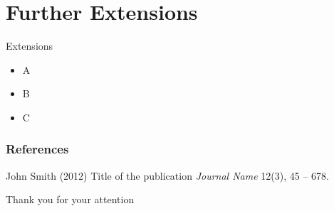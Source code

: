 \documentclass{beamer}
\begin{document}
\section{Further Extensions}
\begin{frame}{Extensions}
    \begin{itemize}
        \item A
        \item B
        \item C
    \end{itemize}
\end{frame}
\begin{frame}
\frametitle{References}
\footnotesize{
\begin{thebibliography}{99} %
 John Smith (2012)
\newblock Title of the publication
\newblock \emph{Journal Name} 12(3), 45 -- 678.
\end{thebibliography}
}
\end{frame}
\begin{frame}
\Huge{\centerline{Thank you for your attention}}
\end{frame}
\end{document}
